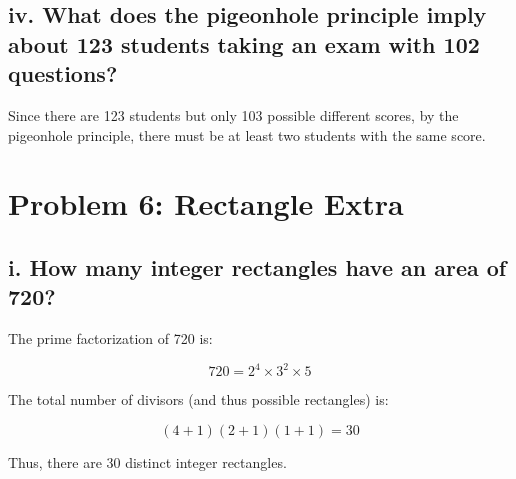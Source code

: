 \documentclass{article}
\begin{document}
\subsection*{iv. What does the pigeonhole principle imply about 123 students taking an exam with 102 questions?}

Since there are 123 students but only 103 possible different scores, by the
pigeonhole principle, there must be at least two students with the same score.

\newpage

\section*{Problem 6: Rectangle Extra}

\subsection*{i. How many integer rectangles have an area of 720?}

The prime factorization of 720 is:

\[
720 = 2^4 \times 3^2 \times 5
\]

The total number of divisors (and thus possible rectangles) is:

\[
(4+1)(2+1)(1+1) = 30
\]

Thus, there are 30 distinct integer rectangles.
\end{document}
